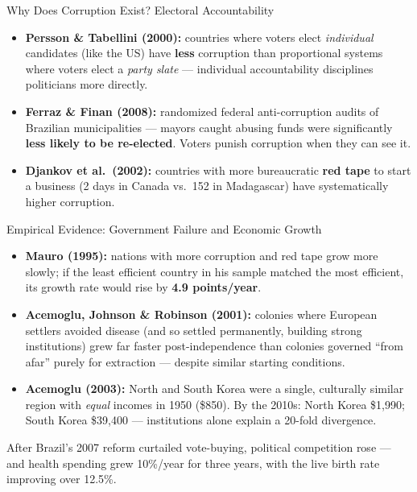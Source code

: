 \documentclass[11pt,aspectratio=169]{beamer}
\begin{document}
\begin{frame}{Why Does Corruption Exist? Electoral Accountability}
  \small
  \begin{itemize}
    \item \textbf{Persson \& Tabellini (2000):} countries where voters elect \emph{individual} candidates (like the US) have \textbf{less} corruption than proportional systems where voters elect a \emph{party slate} --- individual accountability disciplines politicians more directly.
    \item \textbf{Ferraz \& Finan (2008):} randomized federal anti-corruption audits of Brazilian municipalities --- mayors caught abusing funds were significantly \textbf{less likely to be re-elected}. Voters punish corruption when they can see it.
    \item \textbf{Djankov et al.\ (2002):} countries with more bureaucratic \textbf{red tape} to start a business (2 days in Canada vs.\ 152 in Madagascar) have systematically higher corruption.
  \end{itemize}
\end{frame}

\begin{frame}{Empirical Evidence: Government Failure and Economic Growth}
  \small
  \begin{itemize}
    \item \textbf{Mauro (1995):} nations with more corruption and red tape grow more slowly; if the least efficient country in his sample matched the most efficient, its growth rate would rise by \textbf{4.9 points/year}.
    \item \textbf{Acemoglu, Johnson \& Robinson (2001):} colonies where European settlers avoided disease (and so settled permanently, building strong institutions) grew far faster post-independence than colonies governed ``from afar'' purely for extraction --- despite similar starting conditions.
    \item \textbf{Acemoglu (2003):} North and South Korea were a single, culturally similar region with \emph{equal} incomes in 1950 (\$850). By the 2010s: North Korea \$1,990; South Korea \$39,400 --- institutions alone explain a 20-fold divergence.
  \end{itemize}
  \vspace{0.2em}
  \small After Brazil's 2007 reform curtailed vote-buying, political competition rose --- and health spending grew 10\%/year for three years, with the live birth rate improving over 12.5\%.
\end{frame}
\end{document}
